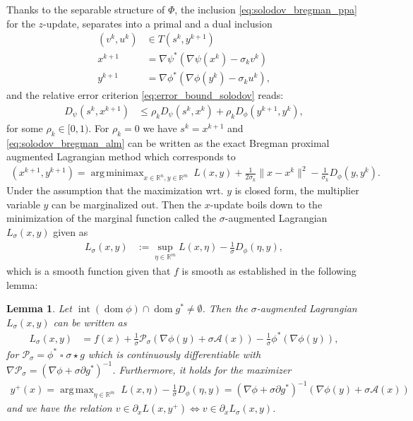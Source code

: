 \documentclass[11pt,onecolumn]{article}
\DeclareMathOperator*{\argminimax}{arg\,minimax}
\DeclareMathOperator*{\argmax}{arg\,max}
\DeclareMathOperator{\infconv}{\mathbin{\square}}
\DeclareMathOperator{\dom}{dom}
\DeclareMathOperator{\intr}{int}
\newcommand{\bR}{\mathbb{R}}
\newtheorem{lemma}[lemma]{Lemma}
\theoremstyle{remark}
\begin{document}
Thanks to the separable structure of $\Phi$, the inclusion \cref{eq:solodov_bregman_ppa} for the $z$-update, separates into a primal and a dual inclusion
\begin{subequations} \label{eq:solodov_bregman_alm}
\begin{align}
    (v^{k}, u^{k}) &\in T(s^{k}, y^{k+1}) \label{eq:alm_solodov_1}\\
x^{k+1} &= \nabla \psi^*(\nabla \psi(x^k) - \sigma_k v^{k}) \label{eq:correction_solodov_primal} \\
y^{k+1} &= \nabla \phi^*(\nabla \phi(y^k) - \sigma_k u^{k}),\label{eq:correction_solodov_dual}
\end{align}
\end{subequations}
and the relative error criterion \cref{eq:error_bound_solodov} reads:
\begin{align}
D_\psi(s^{k},x^{k+1})&\leq \rho_k D_\psi(s^{k},x^k) + \rho_k D_\phi(y^{k+1}, y^k)\label{eq:error_bound_solodov_alm_plain},
\end{align}
for some $\rho_k\in [0,1)$. For $\rho_k=0$ we have $s^{k}= x^{k+1}$ and \cref{eq:solodov_bregman_alm} can be written as the exact Bregman proximal augmented Lagrangian method which corresponds to
\begin{align}
(x^{k+1}, y^{k+1}) = \argminimax_{x \in \bR^n, y \in \bR^m} ~L(x, y) +\tfrac{1}{2\sigma_k}\|x-x^k\|^2- \tfrac{1}{\sigma_k}D_\phi(y, y^k).
\end{align}
Under the assumption that the maximization wrt. $y$ is closed form, the multiplier variable $y$ can be marginalized out. Then the $x$-update boils down to the minimization of the marginal function called the $\sigma$-augmented Lagrangian $L_\sigma(x,y)$ given as
\begin{align}
L_{\sigma}(x, y) &:= \sup_{\eta \in \bR^m} L(x, \eta) - \tfrac{1}{\sigma}D_\phi(\eta, y),
\end{align}
which is a smooth function given that $f$ is smooth as established in the following lemma:
\begin{lemma} \label{thm:bregman_augmented_lagrangian}
   Let $\intr (\dom \phi) \cap \dom g^* \neq \emptyset$. Then the $\sigma$-augmented Lagrangian $L_\sigma(x,y)$ can be written as
\begin{align} \label{eq:augmented_lagr_composite}
L_{\sigma}(x, y) 
&=f(x) + \tfrac{1}{\sigma}\mathcal{P}_\sigma(\nabla \phi(y) + \sigma \mathcal{A}(x)) -\tfrac{1}{\sigma}\phi^*(\nabla \phi(y)),
\end{align}
for $\mathcal{P}_\sigma=\phi^* \infconv \sigma \star g$ which is continuously differentiable with $\nabla \mathcal{P}_\sigma = (\nabla \phi + \sigma \partial g^*)^{-1}$.
Furthermore, it holds for the maximizer
\begin{align}
y^+(x) =\argmax_{\eta \in \bR^m} \; L(x, \eta) - \tfrac{1}{\sigma} D_\phi(\eta, y)= (\nabla \phi + \sigma \partial g^*)^{-1}(\nabla \phi(y) + \sigma \mathcal{A}(x))
\end{align}
and we have the relation $v \in \partial_x L(x, y^+) \Leftrightarrow v \in \partial_x L_{\sigma}(x, y)$.
\end{lemma}
\end{document}
